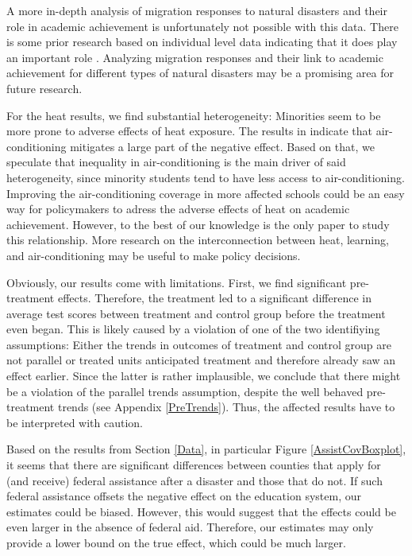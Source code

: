 A more in-depth analysis of migration responses to natural disasters and their role in academic achievement is unfortunately not possible with this data. There is some prior research based on individual level data indicating that it does play an important role \citep[for example][]{Sacerdote_2012}. Analyzing migration responses and their link to academic achievement for different types of natural disasters may be a promising area for future research.

For the heat results, we find substantial heterogeneity: Minorities seem to be more prone to adverse effects of heat exposure. The results in \cite{Goodman_2020} indicate that air-conditioning mitigates a large part of the negative effect. Based on that, we speculate that inequality in air-conditioning is the main driver of said heterogeneity, since minority students tend to have less access to air-conditioning. Improving the air-conditioning coverage in more affected schools could be an easy way for policymakers to adress the adverse effects of heat on academic achievement. However, to the best of our knowledge \cite{Goodman_2020} is the only paper to study this relationship. More research on the interconnection between heat, learning, and air-conditioning may be useful to make policy decisions.

Obviously, our results come with limitations. First, we find significant pre-treatment effects. Therefore, the treatment led to a significant difference in average test scores between treatment and control group before the treatment even began. This is likely caused by a violation of one of the two identifiying assumptions: Either the trends in outcomes of treatment and control group are not parallel or treated units anticipated treatment and therefore already saw an effect earlier. Since the latter is rather implausible, we conclude that there might be a violation of the parallel trends assumption, despite the well behaved pre-treatment trends (see Appendix \ref{PreTrends}). Thus, the affected results have to be interpreted with caution.

Based on the results from Section \ref{Data}, in particular Figure \ref{AssistCovBoxplot}, it seems that there are significant differences between counties that apply for (and receive) federal assistance after a disaster and those that do not. If such federal assistance offsets the negative effect on the education system, our estimates could be biased. However, this would suggest that the effects could be even larger in the absence of federal aid. Therefore, our estimates may only provide a lower bound on the true effect, which could be much larger.

